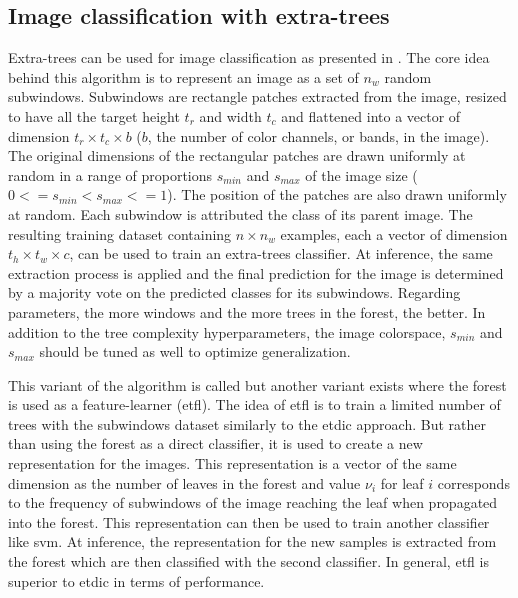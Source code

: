 \subsection{Image classification with extra-trees}
\label{ssec:backml:et_image}

Extra-trees can be used for image classification as presented in \parencite{maree2016towards}.
The core idea behind this algorithm is to represent an image as a set of $n_w$
random subwindows. Subwindows are rectangle patches extracted from the image,
resized to have all the target height $t_r$ and width $t_c$ and flattened into a
vector of dimension $t_r \times t_c \times b$ ($b$, the number of color channels,
or bands, in the image). The original dimensions of the rectangular patches are
drawn uniformly at random in a range of proportions $s_{min}$ and $s_{max}$ of
the image size ($0 <= s_{min} < s_{max} <= 1$). The position of the patches are
also drawn uniformly at random. Each subwindow is attributed the class of its
parent image. The resulting training dataset containing $n \times n_w$ examples,
each a vector of dimension $t_h \times t_w \times c$, can be used to train an
extra-trees classifier. At inference, the same extraction process is applied and
the final prediction for the image is determined by a majority vote on the predicted
classes for its subwindows. Regarding parameters, the more windows and the more
trees in the forest, the better. In addition to the tree complexity hyperparameters,
the image colorspace, $s_{min}$ and $s_{max}$ should be tuned as well to optimize
generalization.

This variant of the algorithm is called  but another variant
exists where the forest is used as a feature-learner (\acrshort{etfl}). The idea
of \acrshort{etfl} is to train a limited number of trees with the subwindows
dataset similarly to the \acrshort{etdic} approach. But rather than using the
forest as a direct classifier, it is used to create a new representation for the
images. This representation is a vector of the same dimension as the number of
leaves in the forest and value $\nu_i$ for leaf $i$ corresponds to the frequency
of subwindows of the image reaching the leaf when propagated into the forest. This
representation can then be used to train another classifier like \acrshort{svm}.
At inference, the representation for the new samples is extracted from the forest
which are then classified with the second classifier. In general, \acrshort{etfl}
is superior to \acrshort{etdic} in terms of performance.


